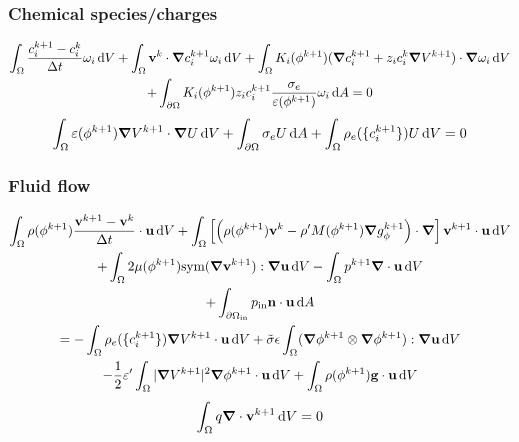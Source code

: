 \documentclass[preprint,pre,superscriptaddress,a4paper]{revtex4-1}
\renewcommand{\v}[1]{\ensuremath{\mathbf{#1}}} %
\newcommand{\gv}[1]{\ensuremath{\mbox{\boldmath$ #1 $}}}
\newcommand{\diff}{\mathrm{d}}
\newcommand{\grad}[1]{\gv{\nabla} #1} %
\renewcommand{\div}[1]{\gv{\nabla} \cdot #1} %
\newcommand{\sym}[1]{\mathrm{sym} #1 }
\newcommand{\inlet}{\mathrm{in}}
\newcommand{\outlet}{\mathrm{out}}
\begin{document}
\subsubsection{Chemical species/charges}
\begin{multline}
  \int_\Omega \frac{c_i^{k+1}-c_i^k}{\Delta t} \omega_i \, \diff V + \int_\Omega \v v^k \cdot \grad c_i^{k+1} \omega_i \, \diff V 
  + \int_\Omega  K_i(\phi^{k+1}) (\grad c_i^{k+1} + z_i c_i^{k} \grad V^{k+1} ) \cdot \grad \omega_i \, \diff V \\
  + \int_{\partial\Omega} K_i(\phi^{k+1}) z_i c_i^{k+1} \frac{\sigma_e}{\varepsilon(\phi^{k+1})} \omega_i  \, \diff A = 0
\end{multline}
\begin{equation}
  \int_\Omega \varepsilon(\phi^{k+1}) \grad V^{k+1} \cdot \grad U \, \diff V
  + \int_{\partial\Omega} \sigma_e  U \, \diff A
  + \int_\Omega  \rho_e(\{c_i^{k+1}\}) U \, \diff V = 0
\end{equation}

\subsubsection{Fluid flow}

\begin{multline}
  \int_\Omega \rho(\phi^{k+1}) \frac{\v v^{k+1} - \v v^k}{\Delta t} \cdot \v u \, \diff V
  + \int_\Omega \left[ \left( \rho(\phi^{k+1}) \v v^k - \rho' M(\phi^{k+1}) \grad g_\phi^{k+1} \right) \cdot \grad \right] \v v^{k+1}\cdot \v u \, \diff V \\
  + \int_\Omega 2\mu(\phi^{k+1}) \sym(\grad \v v^{k+1}) : \grad \v u \, \diff V
  - \int_\Omega p^{k+1} \div \v u \, \diff V \\
  + \int_{\partial\Omega_\inlet} p_\inlet \v n \cdot \v u \, \diff A \\
  = - \int_\Omega \rho_e (\{ c_i^{k+1} \}) \grad V^{k+1} \cdot \v u \, \diff V
  + \tilde\sigma\epsilon \int_\Omega ( \grad \phi^{k+1} \otimes \grad \phi^{k+1} ) : \grad \v u \, \diff V \\
  - \frac{1}{2} \varepsilon' \int_\Omega |\grad V^{k+1}|^2 \grad\phi^{k+1} \cdot \v u \, \diff V
  + \int_\Omega \rho(\phi^{k+1})\v g \cdot \v u \, \diff V
\end{multline}
\begin{equation}
  \int_\Omega q \div \v v^{k+1} \, \diff V = 0
\end{equation}



\end{document}
